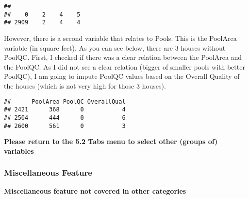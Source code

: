 \documentclass[]{article}
\newenvironment{Shaded}{\begin{snugshade}}{\end{snugshade}}
\newcommand{\KeywordTok}[1]{\textcolor[rgb]{0.13,0.29,0.53}{\textbf{#1}}}
\newcommand{\DecValTok}[1]{\textcolor[rgb]{0.00,0.00,0.81}{#1}}
\newcommand{\StringTok}[1]{\textcolor[rgb]{0.31,0.60,0.02}{#1}}
\newcommand{\OperatorTok}[1]{\textcolor[rgb]{0.81,0.36,0.00}{\textbf{#1}}}
\newcommand{\NormalTok}[1]{#1}
\begin{document}
\begin{verbatim}
## 
##    0    2    4    5 
## 2909    2    4    4
\end{verbatim}

However, there is a second variable that relates to Pools. This is the
PoolArea variable (in square feet). As you can see below, there are 3
houses without PoolQC. First, I checked if there was a clear relation
between the PoolArea and the PoolQC. As I did not see a clear relation
(bigger of smaller pools with better PoolQC), I am going to impute
PoolQC values based on the Overall Quality of the houses (which is not
very high for those 3 houses).

\begin{Shaded}
\end{Shaded}

\begin{verbatim}
##      PoolArea PoolQC OverallQual
## 2421      368      0           4
## 2504      444      0           6
## 2600      561      0           3
\end{verbatim}

\begin{Shaded}
\end{Shaded}

\textbf{Please return to the 5.2 Tabs menu to select other (groups of)
variables}

\subsubsection{Miscellaneous Feature}\label{miscellaneous-feature}

\textbf{Miscellaneous feature not covered in other categories}
\end{document}
